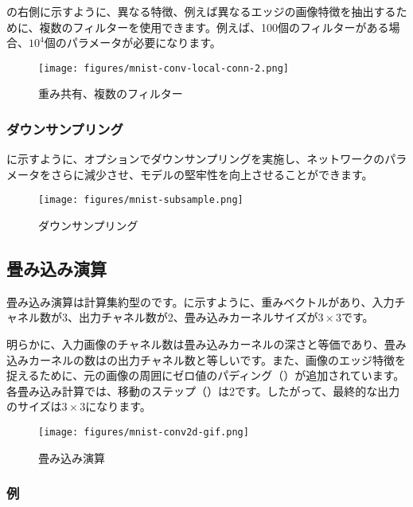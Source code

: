 \begin{content}
\begin{content}
の右側に示すように、異なる特徴、例えば異なるエッジの画像特徴を抽出するために、複数のフィルターを使用できます。例えば、100個のフィルターがある場合、$10^4$個のパラメータが必要になります。

\begin{figure}[H]
\centering
\texttt{[image: figures/mnist-conv-local-conn-2.png]}
\caption{重み共有、複数のフィルター}
 \label{fig:mnist-conv-local-conn-2}
\end{figure}

\subsubsection{ダウンサンプリング}

に示すように、オプションでダウンサンプリングを実施し、ネットワークのパラメータをさらに減少させ、モデルの堅牢性を向上させることができます。

\begin{figure}[H]
\centering
\texttt{[image: figures/mnist-subsample.png]}
\caption{ダウンサンプリング}
 \label{fig:mnist-subsample}
\end{figure}

\subsection{畳み込み演算}

畳み込み演算は計算集約型のです。に示すように、重みベクトルがあり、入力チャネル数が3、出力チャネル数が2、畳み込みカーネルサイズが$3 \times 3$です。

明らかに、入力画像のチャネル数は畳み込みカーネルの深さと等価であり、畳み込みカーネルの数はの出力チャネル数と等しいです。また、画像のエッジ特徴を捉えるために、元の画像の周囲にゼロ値のパディング（）が追加されています。各畳み込み計算では、移動のステップ（）は2です。したがって、最終的な出力のサイズは$3 \times 3$になります。

\begin{figure}[H]
\centering
\texttt{[image: figures/mnist-conv2d-gif.png]}
\caption{畳み込み演算}
 \label{fig:mnist-conv2d-gif}
\end{figure}

\subsubsection{例}


\end{content}
\end{content}
